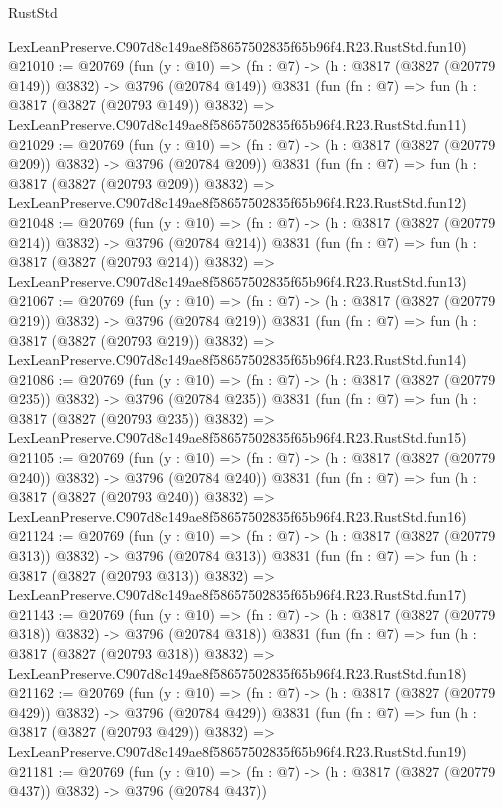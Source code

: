 \begin{lexlean}{RustStd}
\begin{coremodule}
    LexLeanPreserve.C907d8c149ae8f58657502835f65b96f4.R23.RustStd.fun10)
@21010 := @20769
    (fun (y : @10) => (fn : @7) -> (h : @3817 (@3827 (@20779 @149)) @3832) -> @3796 (@20784 @149))
    @3831
    (fun (fn : @7) =>
    fun (h : @3817 (@3827 (@20793 @149)) @3832) =>
    LexLeanPreserve.C907d8c149ae8f58657502835f65b96f4.R23.RustStd.fun11)
@21029 := @20769
    (fun (y : @10) => (fn : @7) -> (h : @3817 (@3827 (@20779 @209)) @3832) -> @3796 (@20784 @209))
    @3831
    (fun (fn : @7) =>
    fun (h : @3817 (@3827 (@20793 @209)) @3832) =>
    LexLeanPreserve.C907d8c149ae8f58657502835f65b96f4.R23.RustStd.fun12)
@21048 := @20769
    (fun (y : @10) => (fn : @7) -> (h : @3817 (@3827 (@20779 @214)) @3832) -> @3796 (@20784 @214))
    @3831
    (fun (fn : @7) =>
    fun (h : @3817 (@3827 (@20793 @214)) @3832) =>
    LexLeanPreserve.C907d8c149ae8f58657502835f65b96f4.R23.RustStd.fun13)
@21067 := @20769
    (fun (y : @10) => (fn : @7) -> (h : @3817 (@3827 (@20779 @219)) @3832) -> @3796 (@20784 @219))
    @3831
    (fun (fn : @7) =>
    fun (h : @3817 (@3827 (@20793 @219)) @3832) =>
    LexLeanPreserve.C907d8c149ae8f58657502835f65b96f4.R23.RustStd.fun14)
@21086 := @20769
    (fun (y : @10) => (fn : @7) -> (h : @3817 (@3827 (@20779 @235)) @3832) -> @3796 (@20784 @235))
    @3831
    (fun (fn : @7) =>
    fun (h : @3817 (@3827 (@20793 @235)) @3832) =>
    LexLeanPreserve.C907d8c149ae8f58657502835f65b96f4.R23.RustStd.fun15)
@21105 := @20769
    (fun (y : @10) => (fn : @7) -> (h : @3817 (@3827 (@20779 @240)) @3832) -> @3796 (@20784 @240))
    @3831
    (fun (fn : @7) =>
    fun (h : @3817 (@3827 (@20793 @240)) @3832) =>
    LexLeanPreserve.C907d8c149ae8f58657502835f65b96f4.R23.RustStd.fun16)
@21124 := @20769
    (fun (y : @10) => (fn : @7) -> (h : @3817 (@3827 (@20779 @313)) @3832) -> @3796 (@20784 @313))
    @3831
    (fun (fn : @7) =>
    fun (h : @3817 (@3827 (@20793 @313)) @3832) =>
    LexLeanPreserve.C907d8c149ae8f58657502835f65b96f4.R23.RustStd.fun17)
@21143 := @20769
    (fun (y : @10) => (fn : @7) -> (h : @3817 (@3827 (@20779 @318)) @3832) -> @3796 (@20784 @318))
    @3831
    (fun (fn : @7) =>
    fun (h : @3817 (@3827 (@20793 @318)) @3832) =>
    LexLeanPreserve.C907d8c149ae8f58657502835f65b96f4.R23.RustStd.fun18)
@21162 := @20769
    (fun (y : @10) => (fn : @7) -> (h : @3817 (@3827 (@20779 @429)) @3832) -> @3796 (@20784 @429))
    @3831
    (fun (fn : @7) =>
    fun (h : @3817 (@3827 (@20793 @429)) @3832) =>
    LexLeanPreserve.C907d8c149ae8f58657502835f65b96f4.R23.RustStd.fun19)
@21181 := @20769
    (fun (y : @10) => (fn : @7) -> (h : @3817 (@3827 (@20779 @437)) @3832) -> @3796 (@20784 @437))

\end{coremodule}
\end{lexlean}

